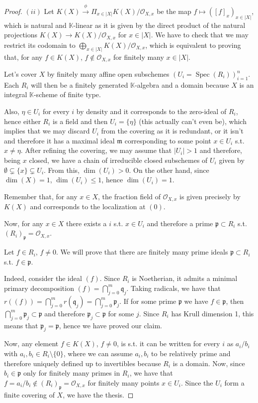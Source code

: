\documentclass{article}
\newcommand{\numberset}{\mathbb}
\newcommand{\K}{\numberset{K}}
\newcommand{\pid}{\mathfrak{p}}
\newcommand{\qid}{\mathfrak{q}}
\newcommand{\mi}{\mathfrak{m}}
\DeclareMathOperator{\Spec}{Spec}
\begin{document}
\begin{proof}
    $(ii)$ Let $K(X)\xrightarrow{\phi}\Pi_{x\in |X|}K(X)/\mathcal{O}_{X,x}$ be
    the map $f\mapsto ([f]_x)_{x\in |X|}$, which is natural and $\K$-linear as
    it is given by the direct product of the natural projections
    $K(X)\rightarrow K(X)/\mathcal{O}_{X,x}$ for $x\in |X|$. We have to check
    that we may restrict its codomain to $\bigoplus_{x\in
    |X|}K(X)/\mathcal{O}_{X,x}$, which is equivalent to proving that, for any
    $f\in K(X)$, $f\not\in\mathcal{O}_{X,x}$ for finitely many $x\in |X|$.

    Let's cover $X$ by finitely many affine open subschemes
    $(U_i=\Spec(R_i))_{i=1}^n$. Each $R_i$ will then be a
    finitely generated $\K$-algebra and a domain because $X$ is an integral
    $\K$-scheme of finite type.
    
    Also, $\eta\in U_i$ for every $i$ by density and it
    corresponds to the zero-ideal of $R_i$, hence either $R_i$ is a field and
    then $U_i=\{\eta\}$ (this actually can't even be), which implies that we may
    discard $U_i$ from the
    covering as it is redundant, or it isn't and therefore it has a maximal
    ideal $\mi$ corresponding to some point $x\in U_i$ s.t. $x\neq\eta$. After
    refining the covering, we may assume that $|U_i|>1$ and therefore, being $x$
    closed, we have a chain of irreducible closed subschemes of $U_i$ given by
    $\emptyset\subsetneq\{x\}\subsetneq U_i$. From this, $\dim(U_i)>0$. On the
    other hand, since $\dim(X)=1$, $\dim(U_i)\leq 1$, hence $\dim(U_i)=1$.
    
    Remember that, for any $x\in X$, the
    fraction field of $\mathcal{O}_{X,x}$ is given precisely by $K(X)$ and
    corresponds to the localization at $(0)$.

    Now, for any $x\in X$ there exists a $i$ s.t. $x\in U_i$ and therefore a
    prime $\pid\subset R_i$ s.t. $(R_i)_\pid=\mathcal{O}_{X,x}$.

    Let $f\in R_i$, $f\neq 0$. We will prove that there are finitely many prime
    ideals $\pid\subset R_i$ s.t. $f\in\pid$.

    Indeed, consider the ideal $(f)$. Since $R_i$ is Noetherian, it admits a
    minimal primary decomposition $(f)=\bigcap_{j=0}^m\qid_j$. Taking radicals,
    we have that $r((f))=\bigcap_{j=0}^mr(\qid_j)=\bigcap_{j=0}^m\pid_j$. If for
    some prime $\pid$ we have $f\in\pid$, then
    $\bigcap_{j=0}^m\pid_j\subset\pid$ and therefore $\pid_j\subset\pid$ for
    some $j$. Since $R_i$ has Krull dimension 1, this means that $\pid_j=\pid$,
    hence we have proved our claim.

    Now, any element $f\in K(X)$, $f\neq 0$, is s.t. it can be written for every
    $i$ as $a_i/b_i$ with $a_i,b_i\in R_i\setminus\{0\}$, where we can assume
    $a_i,b_i$ to be relatively prime and therefore uniquely defined up to
    invertibles because $R_i$ is a domain. Now, since $b_i\in\pid$ only for
    finitely many primes in $R_i$, we have that $f=a_i/b_i\not\in
    (R_i)_\pid=\mathcal{O}_{X,x}$ for finitely many points $x\in U_i$. Since the
    $U_i$ form a finite covering of $X$, we have the thesis.
\end{proof}
\end{document}

